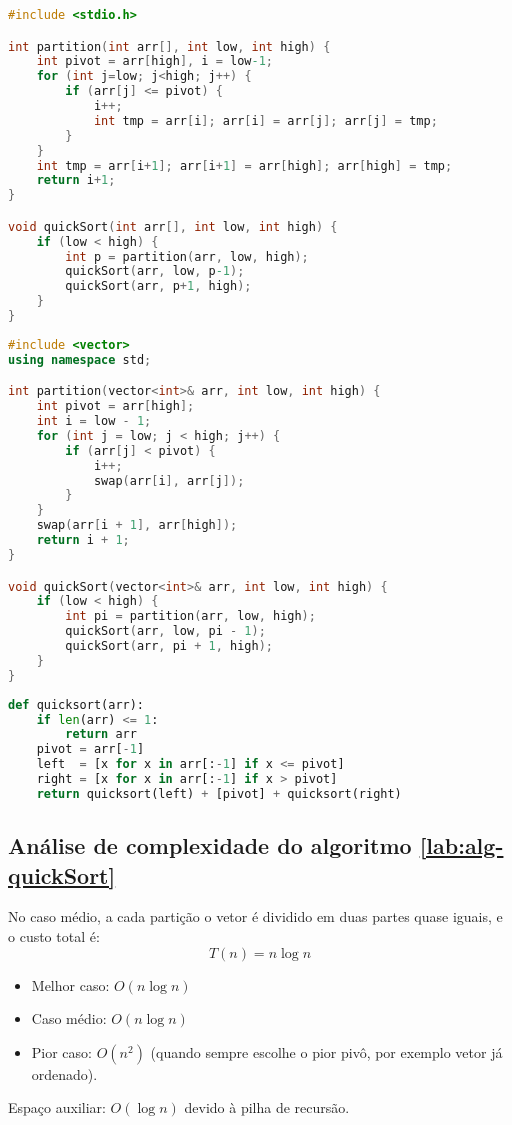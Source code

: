 \begin{lstlisting}[language=C, caption={Implementação do Quicksort em C}, label=code:quickSort]
#include <stdio.h>

int partition(int arr[], int low, int high) {
    int pivot = arr[high], i = low-1;
    for (int j=low; j<high; j++) {
        if (arr[j] <= pivot) {
            i++;
            int tmp = arr[i]; arr[i] = arr[j]; arr[j] = tmp;
        }
    }
    int tmp = arr[i+1]; arr[i+1] = arr[high]; arr[high] = tmp;
    return i+1;
}

void quickSort(int arr[], int low, int high) {
    if (low < high) {
        int p = partition(arr, low, high);
        quickSort(arr, low, p-1);
        quickSort(arr, p+1, high);
    }
}
\end{lstlisting}

\begin{lstlisting}[language=C++,caption={Quick sort em C++},captionpos=t]
#include <vector>
using namespace std;

int partition(vector<int>& arr, int low, int high) {
    int pivot = arr[high];
    int i = low - 1;
    for (int j = low; j < high; j++) {
        if (arr[j] < pivot) {
            i++;
            swap(arr[i], arr[j]);
        }
    }
    swap(arr[i + 1], arr[high]);
    return i + 1;
}

void quickSort(vector<int>& arr, int low, int high) {
    if (low < high) {
        int pi = partition(arr, low, high);
        quickSort(arr, low, pi - 1);
        quickSort(arr, pi + 1, high);
    }
}
\end{lstlisting}


\begin{lstlisting}[language=Python, caption={Quicksort em Python}, label=code:quickSortPy]
def quicksort(arr):
    if len(arr) <= 1:
        return arr
    pivot = arr[-1]
    left  = [x for x in arr[:-1] if x <= pivot]
    right = [x for x in arr[:-1] if x > pivot]
    return quicksort(left) + [pivot] + quicksort(right)
\end{lstlisting}

\subsection{Análise de complexidade do algoritmo \ref{lab:alg-quickSort}}
No caso médio, a cada partição o vetor é dividido em duas partes quase iguais, e o custo total é:
\[
T(n) = n \log n
\]
\begin{itemize}
    \item Melhor caso: $O(n \log n)$
    \item Caso médio: $O(n \log n)$
    \item Pior caso: $O(n^2)$ (quando sempre escolhe o pior pivô, por exemplo vetor já ordenado).
\end{itemize}
Espaço auxiliar: $O(\log n)$ devido à pilha de recursão.

